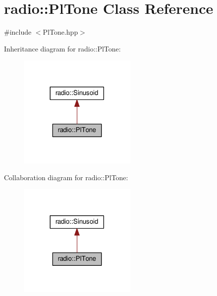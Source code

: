 \hypertarget{classradio_1_1PlTone}{\section{radio\+:\+:Pl\+Tone Class Reference}
\label{classradio_1_1PlTone}
}


{\ttfamily \#include $<$Pl\+Tone.\+hpp$>$}



Inheritance diagram for radio\+:\+:Pl\+Tone\+:
\nopagebreak
\begin{figure}[H]
\begin{center}
\leavevmode
\includegraphics[width=161pt]{classradio_1_1PlTone__inherit__graph}
\end{center}
\end{figure}


Collaboration diagram for radio\+:\+:Pl\+Tone\+:
\nopagebreak
\begin{figure}[H]
\begin{center}
\leavevmode
\includegraphics[width=161pt]{classradio_1_1PlTone__coll__graph}
\end{center}
\end{figure}
